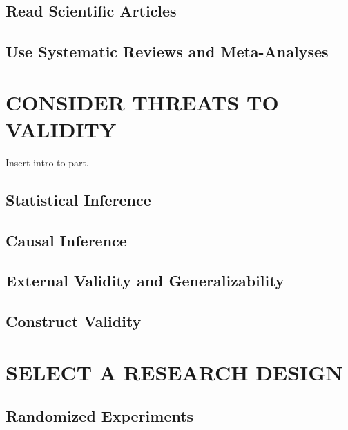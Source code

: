 \documentclass[justified,twoside,symmetric,]{tufte-book}
\begin{document}
\hypertarget{reading}{%
\chapter{Read Scientific Articles}\label{reading}}

\hypertarget{reviews}{%
\chapter{Use Systematic Reviews and Meta-Analyses}\label{reviews}}

\hypertarget{part-consider-threats-to-validity}{%
\part{CONSIDER THREATS TO VALIDITY}\label{part-consider-threats-to-validity}}

Insert intro to part.

\hypertarget{statinfer}{%
\chapter{Statistical Inference}\label{statinfer}}

\hypertarget{causalinfer}{%
\chapter{Causal Inference}\label{causalinfer}}

\hypertarget{external}{%
\chapter{External Validity and Generalizability}\label{external}}

\hypertarget{construct}{%
\chapter{Construct Validity}\label{construct}}

\hypertarget{part-select-a-research-design}{%
\part{SELECT A RESEARCH DESIGN}\label{part-select-a-research-design}}

\hypertarget{experiments}{%
\chapter{Randomized Experiments}\label{experiments}}
\end{document}

